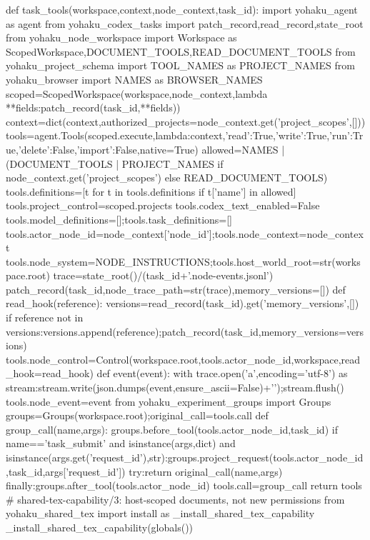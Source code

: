 def task_tools(workspace,context,node_context,task_id):
 import yohaku_agent as agent
 from yohaku_codex_tasks import patch_record,read_record,state_root
 from yohaku_node_workspace import Workspace as ScopedWorkspace,DOCUMENT_TOOLS,READ_DOCUMENT_TOOLS
 from yohaku_project_schema import TOOL_NAMES as PROJECT_NAMES
 from yohaku_browser import NAMES as BROWSER_NAMES
 scoped=ScopedWorkspace(workspace,node_context,lambda **fields:patch_record(task_id,**fields))
 context=dict(context,authorized_projects=node_context.get('project_scopes',[]))
 tools=agent.Tools(scoped.execute,lambda:context,{'read':True,'write':True,'run':True,'delete':False,'import':False},native=True)
 allowed=NAMES | (DOCUMENT_TOOLS | PROJECT_NAMES if node_context.get('project_scopes') else READ_DOCUMENT_TOOLS)
 tools.definitions=[t for t in tools.definitions if t['name'] in allowed]
 tools.project_control=scoped.projects
 tools.codex_text_enabled=False
 tools.model_definitions=[];tools.task_definitions=[]
 tools.actor_node_id=node_context['node_id'];tools.node_context=node_context
 tools.node_system=NODE_INSTRUCTIONS;tools.host_world_root=str(workspace.root)
 trace=state_root()/(task_id+'.node-events.jsonl')
 patch_record(task_id,node_trace_path=str(trace),memory_versions=[])
 def read_hook(reference):
  versions=read_record(task_id).get('memory_versions',[])
  if reference not in versions:versions.append(reference);patch_record(task_id,memory_versions=versions)
 tools.node_control=Control(workspace.root,tools.actor_node_id,workspace,read_hook=read_hook)
 def event(event):
  with trace.open('a',encoding='utf-8') as stream:stream.write(json.dumps(event,ensure_ascii=False)+'\n');stream.flush()
 tools.node_event=event
 from yohaku_experiment_groups import Groups
 groups=Groups(workspace.root);original_call=tools.call
 def group_call(name,args):
  groups.before_tool(tools.actor_node_id,task_id)
  if name=='task_submit' and isinstance(args,dict) and isinstance(args.get('request_id'),str):groups.project_request(tools.actor_node_id,task_id,args['request_id'])
  try:return original_call(name,args)
  finally:groups.after_tool(tools.actor_node_id)
 tools.call=group_call
 return tools
# shared-tex-capability/3: host-scoped documents, not new permissions
from yohaku_shared_tex import install as _install_shared_tex_capability
_install_shared_tex_capability(globals())
